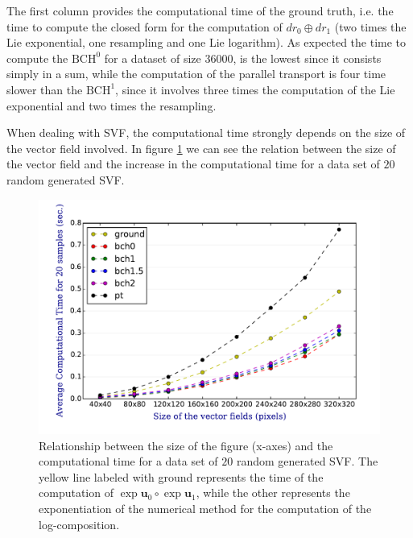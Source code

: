 The first column provides the computational time of the ground truth, i.e. the time to compute the closed form for the computation of $dr_0 \oplus dr_{1}$ (two times the Lie exponential, one resampling and one Lie logarithm). As expected the time to compute the $\text{BCH}^0$ for a dataset of size $36000$, is the lowest since it consists simply in a sum, while the computation of the parallel transport is four time slower than the $\text{BCH}^1$, since it involves three times the computation of the Lie exponential and two times the resampling.

When dealing with SVF, the computational time strongly depends on the size of the vector field involved. In figure \ref{fig:svf_computational_time} we can see the relation between the size of the vector field and the increase in the computational time for a data set of $20$ random generated SVF.

\begin{figure}[!ht]
	\includegraphics[scale=0.7]{figures/svf_computational_time.pdf}
	\caption{Relationship between the size of the figure (x-axes) and the computational time for a data set of $20$ random generated SVF. The yellow line labeled with ground represents the time of the computation of $\exp{\mathbf{u}_0}\circ \exp{\mathbf{u}_1}$, while the other represents the exponentiation of the numerical method for the computation of the log-composition.}
	\label{fig:svf_computational_time}
\end{figure}

